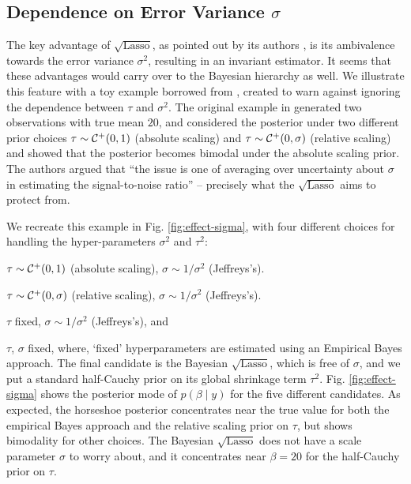 \documentclass[10pt]{article}
\def\sql{$\sqrt{\text{Lasso}}$}
\begin{document}
\subsection{Dependence on Error Variance $\sigma$}

The key advantage of \sql{}, as pointed out by its authors \citep{belloni2011square}, is its ambivalence towards the error variance $\sigma^2$, resulting in an invariant estimator. It seems that these advantages would carry over to the Bayesian hierarchy as well. We illustrate this feature with a toy example borrowed from \citet{polson2010shrink}, created to warn against ignoring the dependence between $\tau$ and $\sigma^2$. The original example in \citet{polson2010shrink} generated two observations with true mean $20$, and considered the posterior under two different prior choices $\tau \sim \mathcal{C}^{+}(0,1)$ (absolute scaling) and $\tau \sim \mathcal{C}^{+}(0,\sigma)$ (relative scaling) and showed that the posterior becomes bimodal under the absolute scaling prior. The authors argued that ``the issue is one of averaging over uncertainty about $\sigma$ in estimating the signal-to-noise ratio'' -- precisely what the \sql{} aims to protect from. 

We recreate this example in Fig. \ref{fig:effect-sigma}, with four different choices for handling the hyper-parameters $\sigma^2$ and $\tau^2$: 
\ben 
\item $\tau \sim \mathcal{C}^+(0,1)$ (absolute scaling), $\sigma \sim 1/\sigma^2$ (Jeffreys's). 
\item $\tau \sim \mathcal{C}^+(0,\sigma)$ (relative scaling), $\sigma \sim 1/\sigma^2$ (Jeffreys's). 
\item $\tau$ fixed, $\sigma \sim 1/\sigma^2$ (Jeffreys's), and
\item $\tau$, $\sigma$ fixed, 
\een
where, `fixed' hyperparameters are estimated using an Empirical Bayes approach. The final candidate is the Bayesian \sql{}, which is free of $\sigma$, and we put a standard half-Cauchy prior on its global shrinkage term $\tau^2$. Fig. \ref{fig:effect-sigma} shows the posterior mode of $p(\beta \mid y)$ for the five different candidates. As expected, the horseshoe posterior concentrates near the true value for both the empirical Bayes approach and the relative scaling prior on $\tau$, but shows bimodality for other choices. The Bayesian \sql{} does not have a scale parameter $\sigma$ to worry about, and it concentrates near $\beta = 20$ for the half-Cauchy prior on $\tau$. 
\end{document}
